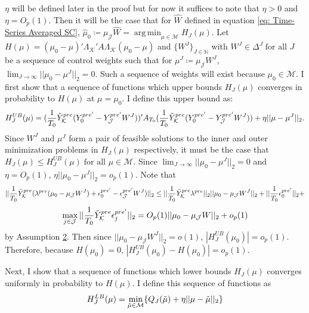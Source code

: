 \documentclass{article}
\DeclareMathOperator*{\argmin}{arg\,min}
\begin{document}
$\eta$ will be defined later in the proof but for now it suffices to note that $\eta > 0$ and $\eta = O_p(1)$. Then it will be the case that for $\hat{W}$ defined in equation \eqref{eq: Time-Series Averaged SC}, $\hat{\mu}_0 \coloneqq \mu_{\mathcal{J}} \hat{W} = \argmin_{\mu \in \mathcal{M}} H_J(\mu)$. Let $H (\mu) = (\mu_0 - \mu)'\Lambda_{\mathcal{K}}' A\Lambda_{\mathcal{K}}(\mu_0 - \mu)$ and $\{W^J\}_{J \in \mathbb{N}}$ with $W^J \in \Delta^J \; \text{for all } J$ be a sequence of control weights such that for $\mu^J \coloneqq \mu_{\mathcal{J}} W^J$, $\lim_{J \rightarrow \infty} ||\mu_0 - \mu^J||_2 = 0$. Such a sequence of weights will exist because $\mu_0 \in \mathcal{M}$. I first show that a sequence of functions which upper bounds $H_J(\mu)$ converges in probability to $H(\mu)$ at $\mu = \mu_0$. I define this upper bound as: 
\begin{equation*}
    H^{UB}_J(\mu) =  (\frac{1}{T_0} \Tilde{Y}_{\mathcal{K}}^{pre}(Y_{0}^{pre'} - Y_{\mathcal{J}}^{pre'}W^J))'A_{T_0}(\frac{1}{T_0} \Tilde{Y}_{\mathcal{K}}^{pre}(Y_{0}^{pre'} - Y_{\mathcal{J}}^{pre'}W^J)) + \eta||\mu - \mu^J||_2.
\end{equation*}
Since $W^J$ and $\mu^J$ form a pair of feasible solutions to the inner and outer minimization problems in $H_J(\mu)$ respectively, it must be the case that $H_J(\mu) \leq H_J^{UB}(\mu) \; \text{for all } \mu \in \mathcal{M}$. Since $\lim_{J \rightarrow \infty} ||\mu_0 - \mu^J||_2 = 0$ and $\eta = O_p(1)$, $\eta||\mu_0 - \mu^J||_2 = o_p(1)$.
Note that
$$||\frac{1}{T_0} \Tilde{Y}_{\mathcal{K}}^{pre}(\lambda^{pre}(\mu_0 - \mu_{\mathcal{J}}W^J) + \epsilon_{0}^{pre'} - \epsilon_{\mathcal{J}}^{pre'}W^J)||_2 \leq ||\frac{1}{T_0} \Tilde{Y}_{\mathcal{K}}^{pre}\lambda^{pre}||_2 ||\mu_0 - \mu_{\mathcal{J}}W^J||_2 + ||\frac{1}{T_0} \epsilon_{0}^{pre'}||_2 +$$
$$\max_{j \in \mathcal{J}}||\frac{1}{T_0} \Tilde{Y}_{\mathcal{K}}^{pre}\epsilon_{j}^{pre'}||_2 = O_p(1) ||\mu_0 - \mu_{\mathcal{J}}W||_2 + o_p(1)$$
by Assumption \hyperref[A2]{2}. Then since
$ ||\mu_0 - \mu_{\mathcal{J}}W^J||_2 = o(1)$, $|H_J^{UB}(\mu_0)| = o_p(1)$. Therefore, because $H (\mu_0) = 0$, $|H_J^{UB}(\mu_0) - H (\mu_0)| = o_p(1)$.
\par 
Next, I show that a sequence of functions which lower bounds $H_J(\mu)$ converges uniformly in probability to $H(\mu)$. I define this sequence of functions as
\begin{equation*}
    H^{LB}_J(\mu) = \min_{\Tilde{\mu} \in \mathcal{M}} \{ Q_J(\Tilde{\mu}) + \eta ||\mu - \Tilde{\mu}||_2 \}
\end{equation*}
\end{document}
